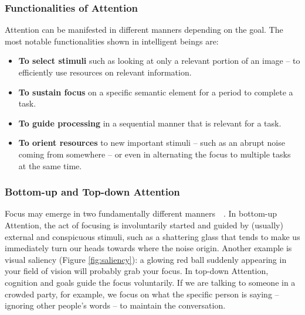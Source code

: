 \documentclass[12pt]{article}
\begin{document}
\subsubsection{Functionalities of Attention}
Attention can be manifested in different manners depending on the goal.
The most notable functionalities shown in intelligent beings are:
\begin{itemize}
    \item \textbf{To select stimuli} such as looking at only a relevant portion of an image --
        to efficiently use resources on relevant information.
    \item \textbf{To sustain focus} on a specific semantic element for a period to complete
        a task.
    \item \textbf{To guide processing} in a sequential manner that is relevant for a task.
    \item \textbf{To orient resources} to new important stimuli
        -- such as an abrupt noise coming from somewhere --
        or even in alternating the focus to multiple tasks at the same time.
\end{itemize}

\subsubsection{Bottom-up and Top-down Attention}
\label{bu-td}
Focus may emerge in two fundamentally different manners~\cite{ref:esther-thesis}~\cite{ref:vocus}.
In bottom-up Attention, the act of focusing is involuntarily
started and guided by (usually) external and conspicuous stimuli,
such as a shattering glass that tends to
make us immediately turn our heads towards where the noise origin.
Another example is visual saliency (Figure \ref{fig:saliency}):
a glowing red ball suddenly appearing in
your field of vision will probably grab your focus.
In top-down Attention, cognition and goals guide the focus voluntarily.
If we are talking to someone in a crowded party, for example,
we focus on what the specific person is saying
-- ignoring other people's words -- to maintain the conversation.
\end{document}
